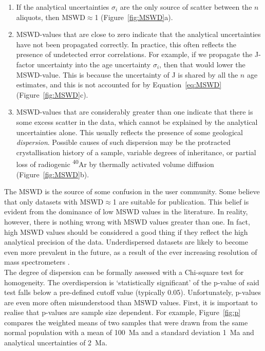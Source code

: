 \documentclass{article}
\begin{document}
\begin{enumerate}
\item If the analytical uncertainties $\sigma_i$ are the only source
  of scatter between the $n$ aliquots, then MSWD$\approx$1
  (Figure~\ref{fig:MSWD}a).

\item MSWD-values that are close to zero indicate that the analytical
  uncertainties have not been propagated correctly. In practice, this
  often reflects the presence of undetected error correlations. For
  example, if we propagate the J-factor uncertainty into the age
  uncertainty $\sigma_i$, then that would lower the MSWD-value. This
  is because the uncertainty of J is shared by all the $n$ age
  estimates, and this is not accounted for by Equation~\ref{eq:MSWD}
  (Figure~\ref{fig:MSWD}c).
  
\item MSWD-values that are considerably greater than one indicate that
  there is some excess scatter in the data, which cannot be explained
  by the analytical uncertainties alone. This usually reflects the
  presence of some geological \emph{dispersion}. Possible causes of
  such dispersion may be the protracted crystallisation history of a
  sample, variable degrees of inheritance, or partial loss of
  radiogenic \textsuperscript{40}Ar by thermally activated volume
  diffusion (Figure~\ref{fig:MSWD}b).
\end{enumerate}

The MSWD is the source of some confusion in the user community.  Some
believe that only datasets with MSWD$\approx$1 are suitable for
publication.  This belief is evident from the dominance of low MSWD
values in the literature.  In reality, however, there is nothing wrong
with MSWD values greater than one. In fact, high MSWD values should be
considered a good thing if they reflect the high analytical precision
of the data.  Underdispersed datasets are likely to become even more
prevalent in the future, as a result of the ever increasing resolution
of mass spectrometers \citep{phillips2013}.\\

The degree of dispersion can be formally assessed with a Chi-square
test for homogeneity. The overdispersion is `statistically
significant' of the p-value of said test falls below a pre-defined
cutoff value (typically 0.05). Unfortunately, p-values are even more
often misunderstood than MSWD values. First, it is important to
realise that p-values are sample size dependent. For example,
Figure~\ref{fig:p} compares the weighted means of two samples that
were drawn from the same normal population with a mean of 100~Ma and a
standard deviation 1~Ma and analytical uncertainties of 2~Ma.\\
\end{document}
